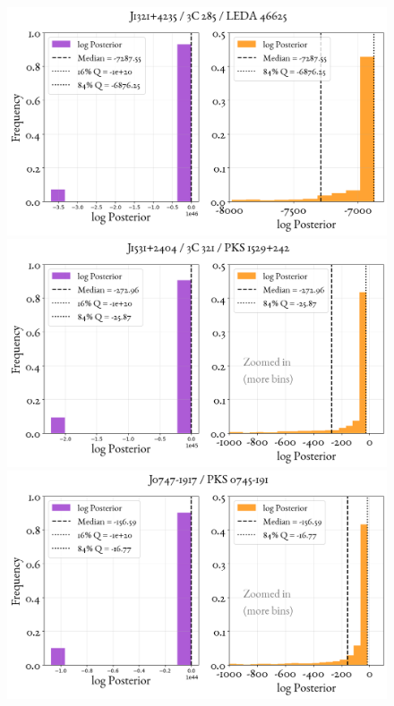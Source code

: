 \begin{figure}
    \centering
    \includegraphics[width=0.8\linewidth]{figures/ResultPosteriors/105_Posterior_5306.png}\\
     \includegraphics[width=0.8\linewidth]{figures/ResultPosteriors/108_Posterior_5314.png}\\
      \includegraphics[width=0.8\linewidth]{figures/ResultPosteriors/109_Posterior_5317.png}  
\end{figure}

